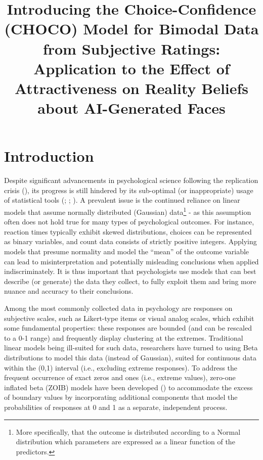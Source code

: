 \documentclass[
  jou,
  floatsintext,
  longtable,
  nolmodern,
  notxfonts,
  notimes,
  colorlinks=true,linkcolor=blue,citecolor=blue,urlcolor=blue]{apa7}
\title{\textbf{Introducing the Choice-Confidence (CHOCO) Model for
Bimodal Data from Subjective Ratings: Application to the Effect of
Attractiveness on Reality Beliefs about AI-Generated Faces}}
\begin{document}
\maketitle



\setcounter{secnumdepth}{-\maxdimen} %

\setlength\LTleft{0pt}

\resetlinenumber[1]



\section{Introduction}\label{introduction}

Despite significant advancements in psychological science following the
replication crisis (), its progress is still hindered by its sub-optimal (or
inappropriate) usage of statistical tools
(;
;
). A prevalent
issue is the continued reliance on linear models that assume normally
distributed (Gaussian) data\footnote{More specifically, that the outcome
  is distributed according to a Normal distribution which parameters are
  expressed as a linear function of the predictors.} - as this
assumption often does not hold true for many types of psychological
outcomes. For instance, reaction times typically exhibit skewed
distributions, choices can be represented as binary variables, and count
data consists of strictly positive integers. Applying models that
presume normality and model the ``mean'' of the outcome variable can
lead to misinterpretation and potentially misleading conclusions when
applied indiscriminately. It is thus important that psychologists use
models that can best describe (or generate) the data they collect, to
fully exploit them and bring more nuance and accuracy to their
conclusions.

Among the most commonly collected data in psychology are responses on
subjective scales, such as Likert-type items or visual analog scales,
which exhibit some fundamental properties: these responses are bounded
(and can be rescaled to a 0-1 range) and frequently display clustering
at the extremes. Traditional linear models being ill-suited for such
data, researchers have turned to using Beta distributions to model this
data (instead of Gaussian), suited for continuous data within the (0,1)
interval (i.e., excluding extreme responses). To address the frequent
occurrence of exact zeros and ones (i.e., extreme values), zero-one
inflated beta (ZOIB) models have been developed
() to
accommodate the excess of boundary values by incorporating additional
components that model the probabilities of responses at 0 and 1 as a
separate, independent process.
\end{document}
